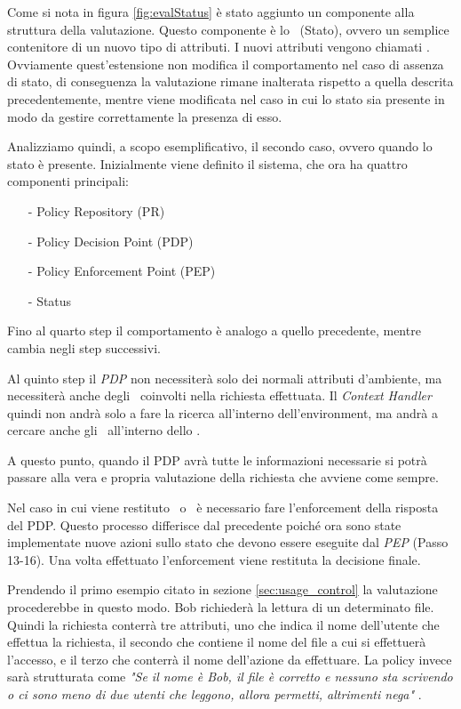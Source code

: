 Come si nota in figura \ref{fig:evalStatus} è stato aggiunto un componente alla struttura della valutazione.
Questo componente è lo \status \ (Stato), ovvero un semplice contenitore di un nuovo tipo di attributi.
I nuovi attributi vengono chiamati \statusattribute. Ovviamente quest'estensione non modifica il comportamento nel caso di assenza di stato, di conseguenza la valutazione rimane inalterata rispetto a quella descrita precedentemente, mentre viene modificata nel caso in cui lo stato sia presente in modo da gestire correttamente la presenza di esso.\\ \par
Analizziamo quindi, a scopo esemplificativo, il secondo caso, ovvero quando lo stato è presente. Inizialmente viene definito il sistema, che ora ha quattro componenti principali:
\begin{itemize}
	\item[-]{Policy Repository (PR)}
	\item[-]{Policy Decision Point (PDP)}
	\item[-]{Policy Enforcement Point (PEP)}
	\item[-]{Status}
\end{itemize}
Fino al quarto step il comportamento è analogo a quello precedente, mentre cambia negli step successivi.\\ \par
Al quinto step il \textit{PDP} non necessiterà solo dei normali attributi d'ambiente, ma necessiterà anche degli \statusattribute \ coinvolti nella richiesta effettuata. Il \textit{Context Handler} quindi non andrà solo a fare la ricerca all'interno dell'environment, ma andrà a cercare anche gli \statusattribute \ all'interno dello \status.\\ \par
A questo punto, quando il PDP avrà tutte le informazioni necessarie si potrà passare alla vera e propria valutazione della richiesta che avviene come sempre.\\ \par
Nel caso in cui viene restituto \permit \ o \deny \ è necessario fare l'enforcement della risposta del PDP. Questo processo differisce dal precedente poiché ora sono state implementate nuove azioni sullo stato che devono essere eseguite dal \textit{PEP} (Passo 13-16). Una volta effettuato l'enforcement viene restituta la decisione finale.\\ \par
Prendendo il primo esempio citato in sezione \ref{sec:usage_control} la valutazione procederebbe in questo modo. Bob richiederà la lettura di un determinato file. Quindi la richiesta conterrà tre attributi, uno che indica il nome dell'utente che effettua la richiesta, il secondo che contiene il nome del file a cui si effettuerà l'accesso, e il terzo che conterrà il nome dell'azione da effettuare. La policy invece sarà strutturata come \textit{"Se il nome è Bob, il file è corretto e nessuno sta scrivendo o ci sono meno di due utenti che leggono, allora permetti, altrimenti nega" }.\\ \par
